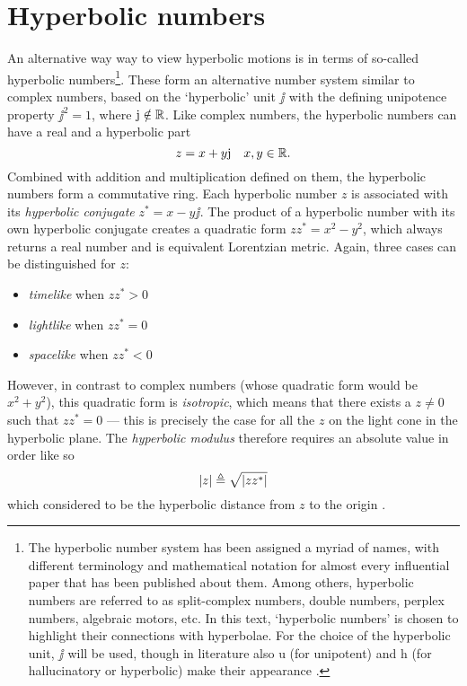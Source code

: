 \section{Hyperbolic numbers}
\label{sec:hyperbolic_numbers}
An alternative way way to view hyperbolic motions is in terms of so-called hyperbolic numbers\footnote{The hyperbolic number system has been assigned a myriad of names, with different terminology and mathematical notation for almost every influential paper that has been published about them. Among others, hyperbolic numbers are referred to as split-complex numbers, double numbers, perplex numbers, algebraic motors, etc. In this text, `hyperbolic numbers' is chosen to highlight their connections with hyperbolae. For the choice of the hyperbolic unit, \(\jj\) will be used, though in literature also \(\mathrm{u}\) (for unipotent) and \(\mathrm{h}\) (for hallucinatory or hyperbolic) make their appearance \cite{Fjelstad1986, Sobczyk1995, Motter1998, Harkin2004}.}. These form an alternative number system similar to complex numbers, based on the `hyperbolic' unit \(\jj\) with the defining unipotence property \(\jj^2 = 1\), where \(\mathrm{j} \notin \mathbb{R}\). Like complex numbers, the hyperbolic numbers can have a real and a hyperbolic part
\[
     z = x + y\mathrm{j} \quad x, y \in \mathbb{R}.
\]
Combined with addition and multiplication defined on them, the hyperbolic numbers form a commutative ring. Each hyperbolic number \(z\) is associated with its \emph{hyperbolic conjugate} \(z^* = x - y\jj\). The product of a hyperbolic number with its own hyperbolic conjugate creates a quadratic form \(zz^* = x^2 - y^2\), which always returns a real number and is equivalent Lorentzian metric. Again, three cases can be distinguished for \(z\):
\begin{itemize}
    \item \emph{timelike} when \(zz^* > 0\)
    \item \emph{lightlike} when \(zz^* = 0\)
    \item \emph{spacelike} when \(zz^* < 0\)
\end{itemize}
However, in contrast to complex numbers (whose quadratic form would be \(x^2 + y^2\)), this quadratic form is \emph{isotropic}, which means that there exists a \(z \neq 0\) such that \(zz^* = 0\) --- this is precisely the case for all the \(z\) on the light cone in the hyperbolic plane. The \emph{hyperbolic modulus} therefore requires an absolute value in order like so
\[
     \abs{z} \triangleq \sqrt{\abs{zz^*}}
\]
which considered to be the hyperbolic distance from \(z\) to the origin \cite{Sobczyk1995}.

